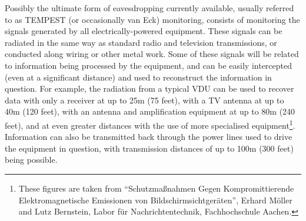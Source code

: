 Possibly the ultimate form of eavesdropping currently available, usually
referred to as TEMPEST (or occasionally van Eck) monitoring, consists of
monitoring the signals generated by all electrically-powered equipment.  These
signals can be radiated in the same way as standard radio and television
transmissions, or conducted along wiring or other metal work.  Some of these
signals will be related to information being processed by the equipment, and
can be easily intercepted (even at a significant distance) and used to
reconstruct the information in question.  For example, the radiation from a
typical VDU can be used to recover data with only a receiver at up to 25m (75
feet), with a TV antenna at up to 40m (120 feet), with an antenna and
amplification equipment at up to 80m (240 feet), and at even greater distances
with the use of more specialised equipment\footnote{
		These figures are taken from ``Schutzma\ss{}nahmen Gegen
              	Kompromittierende Elektromagnetische Emissionen von
              	Bildschirmsichtger\"aten'', Erhard M\"oller and Lutz Bernstein,
              	Labor f\"ur Nachrichtentechnik, Fachhochschule Aachen.
}.  Information can also be
transmitted back through the power lines used to drive the equipment in
question, with transmission distances of up to 100m (300 feet) being possible.


